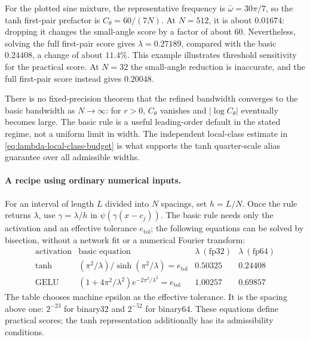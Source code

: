 For the plotted sine mixture, the representative frequency is
$\bar\omega=30\pi/7$, so the tanh first-pair prefactor is
$C_\theta=60/(7N)$. At $N=512$, it is about $0.01674$: dropping it
changes the small-angle score by a factor of about $60$. Nevertheless,
solving the full first-pair score gives $\lambda=0.27189$, compared with
the basic $0.24408$, a change of about $11.4\%$. This example illustrates
threshold sensitivity for the practical score. At $N=32$ the small-angle
reduction is inaccurate, and the full first-pair score instead gives
$0.20048$.

There is no fixed-precision theorem that the refined bandwidth converges
to the basic bandwidth as $N\to\infty$: for $r>0$, $C_\theta$ vanishes
and $|\log C_\theta|$ eventually becomes large. The basic rule is a useful
leading-order default in the stated regime, not a uniform limit in width.
The independent local-class estimate in
\eqref{eq:lambda-local-class-budget} is what supports the tanh quarter-scale
alias guarantee over all admissible widths.

\paragraph{A recipe using ordinary numerical inputs.}
For an interval of length $L$ divided into $N$ spacings, set $h=L/N$.
Once the rule returns $\lambda$, use $\gamma=\lambda/h$ in
$\psi(\gamma(x-c_j))$. The basic rule needs only the activation and
an effective tolerance $e_{\mathrm{tol}}$; the following equations can be solved by
bisection, without a network fit or a numerical Fourier transform:
\[
\begin{array}{c|c|c|c}
\text{activation}&\text{basic equation}&\lambda\ (\text{fp32})&\lambda\ (\text{fp64})\\\hline
\tanh& (\pi^2/\lambda)/\sinh(\pi^2/\lambda)=e_{\mathrm{tol}}&0.50325&0.24408\\
\mathrm{GELU}&(1+4\pi^2/\lambda^2)e^{-2\pi^2/\lambda^2}=e_{\mathrm{tol}}&1.00257&0.69857
\end{array}
\]
The table chooses machine epsilon as the effective tolerance. It is the spacing above one: $2^{-23}$ for binary32
and $2^{-52}$ for binary64. These equations define practical scores; the
tanh representation additionally has its admissibility conditions.


